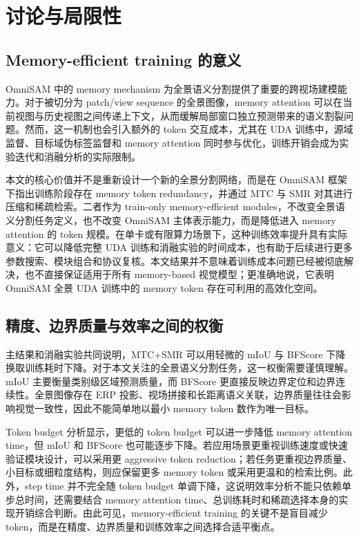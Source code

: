 \section{讨论与局限性}
\label{sec:discussion}

\subsection{Memory-efficient training 的意义}
OmniSAM 中的 memory mechanism 为全景语义分割提供了重要的跨视场建模能力。对于被切分为 patch/view sequence 的全景图像，memory attention 可以在当前视图与历史视图之间传递上下文，从而缓解局部窗口独立预测带来的语义割裂问题。然而，这一机制也会引入额外的 token 交互成本，尤其在 UDA 训练中，源域监督、目标域伪标签监督和 memory attention 同时参与优化，训练开销会成为实验迭代和消融分析的实际限制。

本文的核心价值并不是重新设计一个新的全景分割网络，而是在 OmniSAM 框架下指出训练阶段存在 memory token redundancy，并通过 MTC 与 SMR 对其进行压缩和稀疏检索。二者作为 train-only memory-efficient modules，不改变全景语义分割任务定义，也不改变 OmniSAM 主体表示能力，而是降低进入 memory attention 的 token 规模。在单卡或有限算力场景下，这种训练效率提升具有实际意义：它可以降低完整 UDA 训练和消融实验的时间成本，也有助于后续进行更多参数搜索、模块组合和协议复核。本文结果并不意味着训练成本问题已经被彻底解决，也不直接保证适用于所有 memory-based 视觉模型；更准确地说，它表明 OmniSAM 全景 UDA 训练中的 memory token 存在可利用的高效化空间。

\subsection{精度、边界质量与效率之间的权衡}
主结果和消融实验共同说明，MTC+SMR 可以用轻微的 mIoU 与 BFScore 下降换取训练耗时下降。对于本文关注的全景语义分割任务，这一权衡需要谨慎理解。mIoU 主要衡量类别级区域预测质量，而 BFScore 更直接反映边界定位和边界连续性。全景图像存在 ERP 投影、视场拼接和长距离语义关联，边界质量往往会影响视觉一致性，因此不能简单地以最小 memory token 数作为唯一目标。

Token budget 分析显示，更低的 token budget 可以进一步降低 memory attention time，但 mIoU 和 BFScore 也可能逐步下降。若应用场景更重视训练速度或快速验证模块设计，可以采用更 aggressive token reduction；若任务更重视边界质量、小目标或细粒度结构，则应保留更多 memory token 或采用更温和的检索比例。此外，step time 并不完全随 token budget 单调下降，这说明效率分析不能只依赖单步总时间，还需要结合 memory attention time、总训练耗时和稀疏选择本身的实现开销综合判断。由此可见，memory-efficient training 的关键不是盲目减少 token，而是在精度、边界质量和训练效率之间选择合适平衡点。

